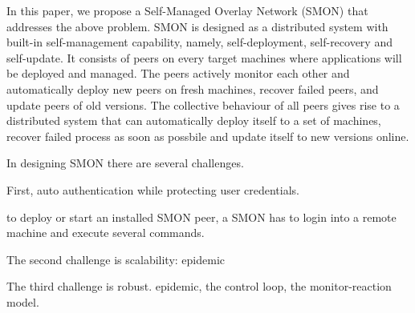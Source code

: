 In this paper, we propose a Self-Managed Overlay Network
(SMON) that addresses the above problem. SMON is designed as
a distributed system with built-in self-management
capability, namely, self-deployment, self-recovery and
self-update. It consists of peers on every target machines
where applications will be deployed and managed. The peers
actively monitor each other and automatically deploy new
peers on fresh machines, recover failed peers, and update
peers of old versions. The collective behaviour of all peers
gives rise to a distributed system that can automatically
deploy itself to a set of machines, recover failed process
as soon as possbile and update itself to new versions
online.




In designing SMON there are several challenges.

First, auto authentication while protecting user
credentials.

to deploy or start an installed SMON peer, a
SMON has to login into a remote machine and execute several
commands.

The second challenge is
scalability: epidemic

The third challenge is robust. epidemic, the control loop,
the monitor-reaction model.

